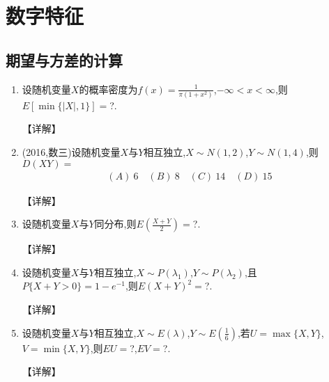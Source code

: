 \documentclass[12pt, a4paper, oneside, UTF8]{ctexbook}
\begin{document}
% 
\else
\fi

\chapter{数字特征}

\section{期望与方差的计算}

\begin{enumerate}[label=\arabic*.]
    \item 设随机变量$X$的概率密度为$f(x)=\frac{1}{\pi(1+x^2)}$,$-\infty<x<\infty$,则$E[\min\{|X|,1\}]=$?.
    
    \begin{solution}
    【详解】
    \end{solution}
    
    \item (2016,数三)设随机变量$X$与$Y$相互独立,$X\sim N(1,2)$,$Y\sim N(1,4)$,则$D(XY)=$
    \begin{align*}
        (A)\ 6 \quad (B)\ 8 \quad (C)\ 14 \quad (D)\ 15
    \end{align*}
    
    \begin{solution}
    【详解】
    \end{solution}
    
    \item 设随机变量$X$与$Y$同分布,则$E\left(\frac{X+Y}{2}\right)=$?.
    
    \begin{solution}
    【详解】
    \end{solution}
    
    \item 设随机变量$X$与$Y$相互独立,$X\sim P(\lambda_1)$,$Y\sim P(\lambda_2)$,且$P\{X+Y>0\}=1-e^{-1}$,则$E(X+Y)^2=$?.
    
    \begin{solution}
    【详解】
    \end{solution}
    
    \item 设随机变量$X$与$Y$相互独立,$X\sim E(\lambda)$,$Y\sim E\left(\frac{1}{6}\right)$,若$U=\max\{X,Y\}$,$V=\min\{X,Y\}$,则$EU=$?,$EV=$?.
    
    \begin{solution}
    【详解】
    \end{solution}
    

\end{enumerate}
\end{document}

